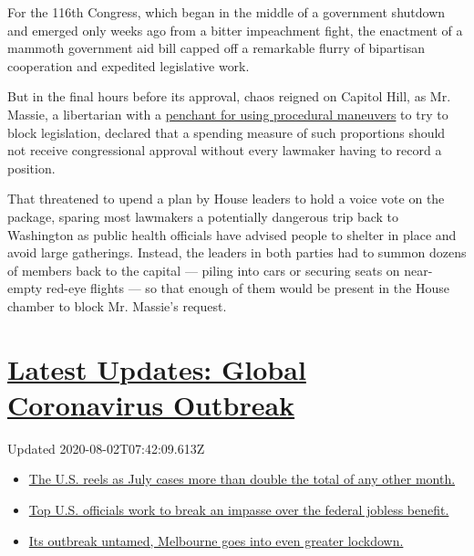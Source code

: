 For the 116th Congress, which began in the middle of a government
shutdown and emerged only weeks ago from a bitter impeachment fight, the
enactment of a mammoth government aid bill capped off a remarkable
flurry of bipartisan cooperation and expedited legislative work.

But in the final hours before its approval, chaos reigned on Capitol
Hill, as Mr. Massie, a libertarian with a
\href{https://www.nytimes.com/2019/05/28/us/politics/disaster-relief-bill.html}{penchant
for using procedural maneuvers} to try to block legislation, declared
that a spending measure of such proportions should not receive
congressional approval without every lawmaker having to record a
position.

That threatened to upend a plan by House leaders to hold a voice vote on
the package, sparing most lawmakers a potentially dangerous trip back to
Washington as public health officials have advised people to shelter in
place and avoid large gatherings. Instead, the leaders in both parties
had to summon dozens of members back to the capital --- piling into cars
or securing seats on near-empty red-eye flights --- so that enough of
them would be present in the House chamber to block Mr. Massie's
request.

\hypertarget{latest-updates-global-coronavirus-outbreak}{%
\section{\texorpdfstring{\href{https://www.nytimes.com/2020/08/01/world/coronavirus-covid-19.html?action=click\&pgtype=Article\&state=default\&region=MAIN_CONTENT_1\&context=storylines_live_updates}{Latest
Updates: Global Coronavirus
Outbreak}}{Latest Updates: Global Coronavirus Outbreak}}\label{latest-updates-global-coronavirus-outbreak}}

Updated 2020-08-02T07:42:09.613Z

\begin{itemize}
\tightlist
\item
  \href{https://www.nytimes.com/2020/08/01/world/coronavirus-covid-19.html?action=click\&pgtype=Article\&state=default\&region=MAIN_CONTENT_1\&context=storylines_live_updates\#link-34047410}{The
  U.S. reels as July cases more than double the total of any other
  month.}
\item
  \href{https://www.nytimes.com/2020/08/01/world/coronavirus-covid-19.html?action=click\&pgtype=Article\&state=default\&region=MAIN_CONTENT_1\&context=storylines_live_updates\#link-780ec966}{Top
  U.S. officials work to break an impasse over the federal jobless
  benefit.}
\item
  \href{https://www.nytimes.com/2020/08/01/world/coronavirus-covid-19.html?action=click\&pgtype=Article\&state=default\&region=MAIN_CONTENT_1\&context=storylines_live_updates\#link-2bc8948}{Its
  outbreak untamed, Melbourne goes into even greater lockdown.}
\end{itemize}

